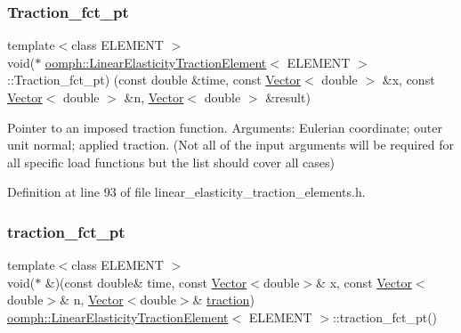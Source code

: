 \subsubsection{\texorpdfstring{Traction\+\_\+fct\+\_\+pt}{Traction\_fct\_pt}}
{\footnotesize\ttfamily template$<$class E\+L\+E\+M\+E\+NT $>$ \\
void($\ast$ \hyperlink{classoomph_1_1LinearElasticityTractionElement}{oomph\+::\+Linear\+Elasticity\+Traction\+Element}$<$ E\+L\+E\+M\+E\+NT $>$\+::Traction\+\_\+fct\+\_\+pt) (const double \&time, const \hyperlink{classoomph_1_1Vector}{Vector}$<$ double $>$ \&x, const \hyperlink{classoomph_1_1Vector}{Vector}$<$ double $>$ \&n, \hyperlink{classoomph_1_1Vector}{Vector}$<$ double $>$ \&result)\hspace{0.3cm}{\ttfamily [protected]}}



Pointer to an imposed traction function. Arguments\+: Eulerian coordinate; outer unit normal; applied traction. (Not all of the input arguments will be required for all specific load functions but the list should cover all cases) 



Definition at line 93 of file linear\+\_\+elasticity\+\_\+traction\+\_\+elements.\+h.

\mbox{\label{classoomph_1_1LinearElasticityTractionElement_a2756f6824ef495ce20ac722c35a0f4f8}} 
\subsubsection{\texorpdfstring{traction\+\_\+fct\+\_\+pt}{traction\_fct\_pt}}
{\footnotesize\ttfamily template$<$class E\+L\+E\+M\+E\+NT $>$ \\
void($\ast$ \&)(const double\& time, const \hyperlink{classoomph_1_1Vector}{Vector}$<$double$>$\& x, const \hyperlink{classoomph_1_1Vector}{Vector}$<$double$>$\& n, \hyperlink{classoomph_1_1Vector}{Vector}$<$double$>$\& \hyperlink{classoomph_1_1LinearElasticityTractionElement_aefc580c2f9219976426f5c0b5f70ca77}{traction}) \hyperlink{classoomph_1_1LinearElasticityTractionElement}{oomph\+::\+Linear\+Elasticity\+Traction\+Element}$<$ E\+L\+E\+M\+E\+NT $>$\+::traction\+\_\+fct\+\_\+pt()\hspace{0.3cm}{\ttfamily [inline]}}



